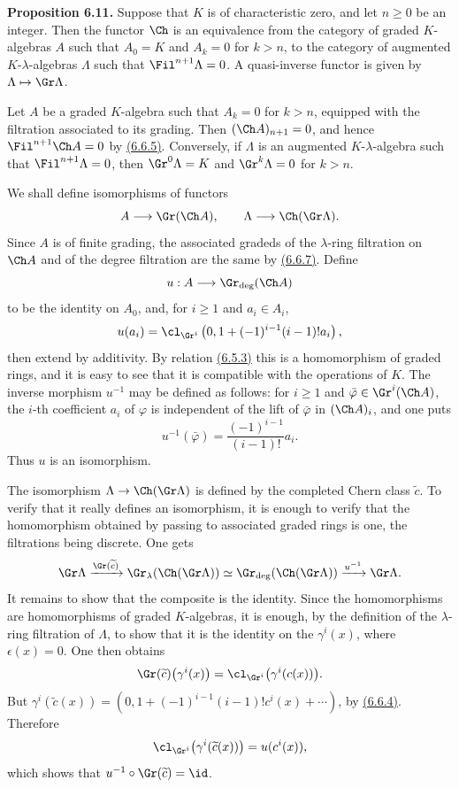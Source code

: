 \textbf{Proposition 6.11.} Suppose that \(K\) is of characteristic zero, and let \(n\ge0\) be an integer. Then the functor \(\Ch\) is an equivalence from the category of graded \(K\)-algebras \(A\) such that \(A_0=K\) and \(A_k=0\) for \(k>n\), to the category of augmented \(K\)-\(\lambda\)-algebras \(\Lambda\) such that \(\Fil^{n+1}\Lambda=0\). A quasi-inverse functor is given by \(\Lambda\mapsto\Gr\Lambda\).

Let \(A\) be a graded \(K\)-algebra such that \(A_k=0\) for \(k>n\), equipped with the filtration associated to its grading. Then \((\Ch A)_{n+1}=0\), and hence \(\Fil^{n+1}\Ch A=0\) by \hyperlink{sga6.e05.cor.6-6-5}{(6.6.5)}. Conversely, if \(\Lambda\) is an augmented \(K\)-\(\lambda\)-algebra such that \(\Fil^{n+1}\Lambda=0\), then \(\Gr^0\Lambda=K\) and \(\Gr^k\Lambda=0\) for \(k>n\).

We shall define isomorphisms of functors
\[
  A\longrightarrow \Gr(\Ch A),
  \qquad
  \Lambda\longrightarrow\Ch(\Gr\Lambda).
\]
Since \(A\) is of finite grading, the associated gradeds of the \(\lambda\)-ring filtration on \(\Ch A\) and of the degree filtration are the same by \hyperlink{sga6.e05.cor.6-6-7}{(6.6.7)}. Define
\[
  u:A\longrightarrow \Gr_{\deg}(\Ch A)
\]
to be the identity on \(A_0\), and, for \(i\ge1\) and \(a_i\in A_i\),
\[
  u(a_i)=
  \cl_{\Gr^i}\left(0,1+(-1)^{i-1}(i-1)!a_i\right),
\]
then extend by additivity. By relation \hyperlink{sga6.e05.eq.6-5-3}{(6.5.3)} this is a homomorphism of graded rings, and it is easy to see that it is compatible with the operations of \(K\). The inverse morphism \(u^{-1}\) may be defined as follows: for \(i\ge1\) and \(\bar\varphi\in\Gr^i(\Ch A)\), the \(i\)-th coefficient \(a_i\) of \(\varphi\) is independent of the lift of \(\bar\varphi\) in \((\Ch A)_i\), and one puts
\[
  u^{-1}(\bar\varphi)=\frac{(-1)^{i-1}}{(i-1)!}a_i.
\]
Thus \(u\) is an isomorphism.

The isomorphism \(\Lambda\to\Ch(\Gr\Lambda)\) is defined by the completed Chern class \(\widetilde c\). To verify that it really defines an isomorphism, it is enough to verify that the homomorphism obtained by passing to associated graded rings is one, the filtrations being discrete. One gets
\[
  \Gr\Lambda
   \xrightarrow{\Gr(\widetilde c)}
  \Gr_{\lambda}(\Ch(\Gr\Lambda))
   \simeq
  \Gr_{\deg}(\Ch(\Gr\Lambda))
   \xrightarrow{u^{-1}}
  \Gr\Lambda .
\]
It remains to show that the composite is the identity. Since the homomorphisms are homomorphisms of graded \(K\)-algebras, it is enough, by the definition of the \(\lambda\)-ring filtration of \(\Lambda\), to show that it is the identity on the \(\gamma^i(x)\), where \(\epsilon(x)=0\). One then obtains
\[
  \Gr(\widetilde c)\bigl(\gamma^i(x)\bigr)
  =
  \cl_{\Gr^i}\bigl(\gamma^i(c(x))\bigr).
\]
But \(\gamma^i(\widetilde c(x))=(0,1+(-1)^{i-1}(i-1)!c^i(x)+\cdots)\), by \hyperlink{sga6.e05.cor.6-6-4}{(6.6.4)}. Therefore
\[
  \cl_{\Gr^i}\bigl(\gamma^i(\widetilde c(x))\bigr)=u(c^i(x)),
\]
which shows that \(u^{-1}\circ\Gr(\widetilde c)=\id\).

